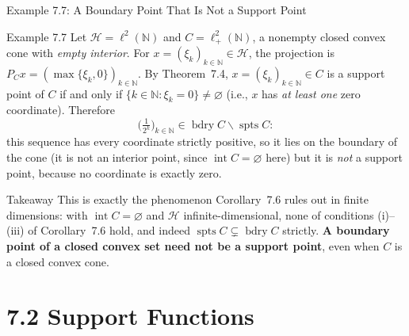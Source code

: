 \documentclass[aspectratio=169,10pt]{beamer}
\DeclareMathOperator{\spts}{spts}
\DeclareMathOperator{\bdry}{bdry}
\DeclareMathOperator{\Int}{int}
\newcommand{\N}{\mathbb{N}}
\newcommand{\Hil}{\mathcal{H}}
\begin{document}
\begin{frame}{Example 7.7: A Boundary Point That Is Not a Support Point}

  \begin{exampleblock}{Example 7.7}
    Let $\Hil = \ell^2(\N)$ and $C = \ell^2_+(\N)$, a nonempty closed convex
    cone with \emph{empty interior}. For $x = (\xi_k)_{k\in\N} \in \Hil$, the
    projection is $P_Cx = (\max\{\xi_k,0\})_{k\in\N}$. By Theorem~7.4,
    $x = (\xi_k)_{k\in\N} \in C$ is a support point of $C$ if and only if
    $\{k \in \N : \xi_k = 0\} \ne \varnothing$ (i.e., $x$ has \emph{at least
    one} zero coordinate). Therefore
    \[
      \Big(\tfrac{1}{2^k}\Big)_{k\in\N} \in \bdry C \smallsetminus \spts C:
    \]
    this sequence has every coordinate strictly positive, so it lies on the
    boundary of the cone (it is not an interior point, since $\Int C =
    \varnothing$ here) but it is \emph{not} a support point, because no
    coordinate is exactly zero.
  \end{exampleblock}

  \begin{block}{Takeaway}
    This is exactly the phenomenon Corollary~7.6 rules out in finite
    dimensions: with $\Int C = \varnothing$ and $\Hil$ infinite-dimensional,
    none of conditions (i)--(iii) of Corollary~7.6 hold, and indeed
    $\spts C \subsetneq \bdry C$ strictly. \textbf{A boundary point of a
    closed convex set need not be a support point}, even when $C$ is a
    closed convex cone.
  \end{block}

\end{frame}

\section{7.2 Support Functions}
\end{document}
